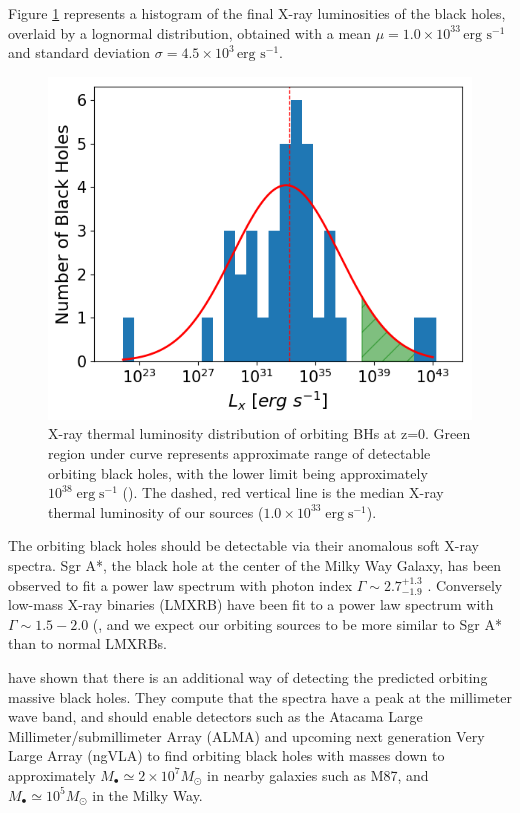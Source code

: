 \documentclass[fleqn,usenatbib,useAMS]{mnras}
\begin{document}
Figure \ref{fig:ldobhs} represents a histogram of the final X-ray luminosities of the black holes, overlaid by a lognormal distribution, obtained with a mean $\mu=1.0\times10^{33}\,\text{erg s}^{-1}$ and standard deviation $\sigma=4.5\times10^{3}\,\text{erg s}^{-1}$.
\begin{figure}
\begin{center}
\includegraphics[width=1.0\columnwidth]{plots/Final_Luminosities_using_Kohei_factor.png}
\caption{X-ray thermal luminosity distribution of orbiting BHs at z=0.  Green region under curve represents approximate range of detectable orbiting black holes, with the lower limit being approximately $10^{38}\;\text{erg}\;\text{s}^{-1}$ (\citet{2018ApJ...862...73L}). The dashed, red vertical line is the median X-ray thermal luminosity of our sources ($1.0\times10^{33}\;\text{erg}\;\text{s}^{-1}$).}
\label{fig:ldobhs}
\end{center}
\end{figure}

The orbiting black holes should be detectable via their anomalous soft X-ray spectra. Sgr A*, the black hole at the center of the Milky Way Galaxy, has been observed to fit a power law spectrum with photon index $\Gamma\sim2.7^{+1.3}_{-1.9}$ \citet{2003ApJ...591..891B}.  Conversely low-mass X-ray binaries (LMXRB) have been fit to a power law spectrum with $\Gamma\sim1.5-2.0$ (\citet{2018Natur.556...70H}, and we expect our orbiting sources to be more similar to Sgr A* than to normal LMXRBs.

\citet{guo2020hunting} have shown that there is an additional way of detecting the predicted orbiting massive black holes. They compute that the spectra have a peak at the millimeter wave band, and should enable detectors such as the Atacama Large Millimeter/submillimeter Array (ALMA) and upcoming next generation Very Large Array (ngVLA) to find orbiting black holes with masses down to approximately $M_{\bullet}\simeq2\times10^7 M_{\odot}$ in nearby galaxies such as M87, and $M_{\bullet}\simeq10^5 M_{\odot}$ in the Milky Way.
\end{document}
